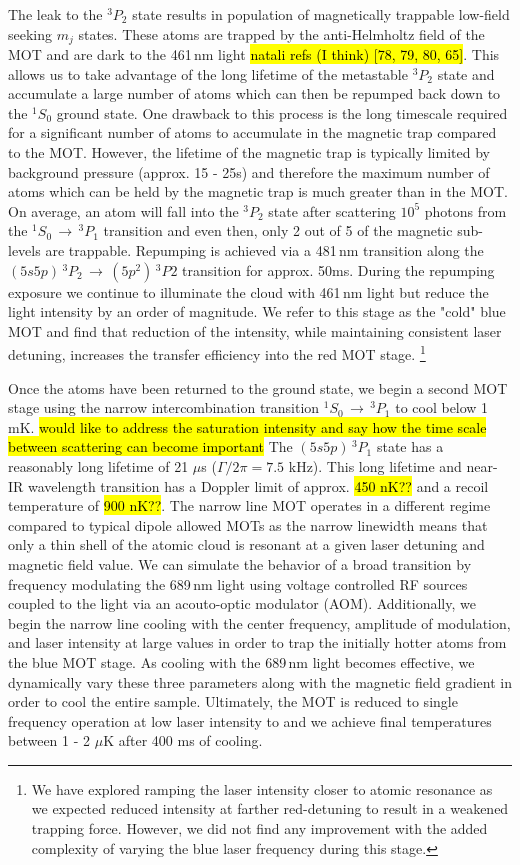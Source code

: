 The leak to the $^3P_2$ state results in population of magnetically trappable low-field seeking $m_j$ states. 
These atoms are trapped by the anti-Helmholtz field of the MOT and are dark to the 461\,nm light \hl{natali refs (I think) [78, 79, 80, 65]}.
This allows us to take advantage of the long lifetime of the metastable $^3P_2$ state and accumulate a large number of atoms which can then be repumped back down to the $^1S_0$ ground state.
One drawback to this process is the long timescale required for a significant number of atoms to accumulate in the magnetic trap compared to the MOT.
However, the lifetime of the magnetic trap is typically limited by background pressure (approx. 15 - 25s) and therefore the maximum number of atoms which can be held by the magnetic trap is much greater than in the MOT.
On average, an atom will fall into the $^3P_2$ state after scattering $10^5$ photons from the $^1S_0\,\rightarrow\,^3P_1$ transition and even then, only 2 out of 5 of the magnetic sub-levels are trappable.
Repumping is achieved via a 481\,nm transition along the $(5s5p)\,^3P_2\,\rightarrow\,(5p^2)\,^3P2$ transition for approx. 50ms.
During the repumping exposure we continue to illuminate the cloud with 461\,nm light but reduce the light intensity by an order of magnitude.
We refer to this stage as the "cold" blue MOT and find that reduction of the intensity, while maintaining consistent laser detuning, increases the transfer efficiency into the red MOT stage.
\footnote{We have explored ramping the laser intensity closer to atomic resonance as we expected reduced intensity at farther red-detuning to result in a weakened trapping force.
However, we did not find any improvement with the added complexity of varying the blue laser frequency during this stage.}

Once the atoms have been returned to the ground state, we begin a second MOT stage using the narrow intercombination transition $^1S_0\,\rightarrow\,^3P_1$ to cool below 1 mK.
\hl{would like to address the saturation intensity and say how the time scale between scattering can become important}
The $(5s5p)\,^3P_1$ state has a reasonably long lifetime of 21 $\mu$s ($\Gamma/2\pi=7.5$ kHz).
This long lifetime and near-IR wavelength transition has a Doppler limit of approx. \hl{450 nK??} and a recoil temperature of \hl{900 nK??}.
The narrow line MOT operates in a different regime compared to typical dipole allowed MOTs as the narrow linewidth means that only a thin shell of the atomic cloud is resonant at a given laser detuning and magnetic field value.
We can simulate the behavior of a broad transition by frequency modulating the 689\,nm light using voltage controlled RF sources coupled to the light via an acouto-optic modulator (AOM). 
Additionally, we begin the narrow line cooling with the center frequency, amplitude of modulation, and laser intensity at large values in order to trap the initially hotter atoms from the blue MOT stage. 
As cooling with the 689\,nm light becomes effective, we dynamically vary these three parameters along with the magnetic field gradient in order to cool the entire sample.
Ultimately, the MOT is reduced to single frequency operation at low laser intensity to and we achieve final temperatures between 1 - 2 $\mu$K after 400 ms of cooling.

